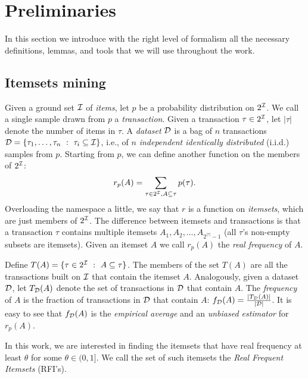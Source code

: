 \section{Preliminaries}\label{sec:prelims}
In this section we introduce with the right level of formalism all the necessary
definitions, lemmas, and tools that we will use throughout the work.

\subsection{Itemsets mining}\label{sec:itemdef}
Given a ground set ${\cal I}$ of \emph{items}, let $p$ be a
probability distribution on $2^{{\cal I}}$. We call a single sample drawn from $p$
a \emph{transaction}. Given a transaction $\tau\in2^{{\cal I}}$, let $|\tau|$ denote
the number of items in $\tau$. A \emph{dataset} ${\cal D}$ is a bag of $n$
transactions ${\cal D}=\{\tau_1,\dots,\tau_n ~:~ \tau_i\subseteq{\cal I}\}$, i.e., of $n$
\emph{independent identically distributed} (i.i.d.) samples from $p$. Starting
from $p$, we can define another function on the members of $2^{{\cal I}}$:
\[
r_p(A) = \sum_{\tau\in 2^{\cal I},A\subseteq\tau}p(\tau).
\]
Overloading the namespace a little, we say that $r$ is a function on
\emph{itemsets}, which are just members of $2^{{\cal I}}$. The
difference between itemsets and transactions is that a transaction $\tau$ contains
multiple itemsets $A_1,A_2,\dots,A_{2^{|\tau|}-1}$ (all $\tau$'s non-empty subsets
are itemsets). Given an itemset $A$ we call $r_p(A)$ the \emph{real frequency} of
$A$.

Define $T(A)=\{\tau\in 2^{{\cal I}} ~:~ A\subseteq \tau\}$. The members of the set
$T(A)$ are all the transactions built on ${\cal I}$
that contain the itemset $A$. Analogously, given a dataset ${\cal D}$, let $T_{\cal D}(A)$ denote
the set of transactions in ${\cal D}$ that contain $A$. The \emph{frequency} of $A$ is
the fraction of transactions in ${\cal D}$ that contain $A$: $f_{\cal D}(A)=
\frac{|T_{\cal D}(A)|}{|{\cal D}|}$. It is easy to see that $f_{\cal D}(A)$ is the
\emph{empirical average} and an \emph{unbiased estimator} for $r_p(A)$. 

In this work, we are interested in finding the itemsets that have
real frequency at least $\theta$ for some $\theta\in(0,1]$. We call the set of
such itemsets the \emph{Real Frequent Itemsets} (RFI's).

